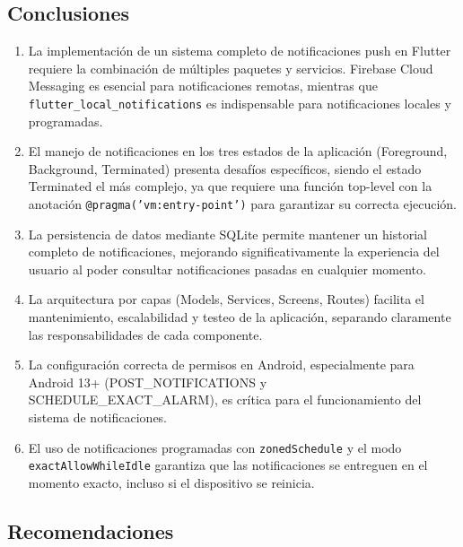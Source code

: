 \documentclass[12pt,a4paper]{article}
\begin{document}
\subsection*{Conclusiones}

\begin{enumerate}
    \item La implementación de un sistema completo de notificaciones push en Flutter requiere la combinación de múltiples paquetes y servicios. Firebase Cloud Messaging es esencial para notificaciones remotas, mientras que \texttt{flutter\_local\_notifications} es indispensable para notificaciones locales y programadas.

    \item El manejo de notificaciones en los tres estados de la aplicación (Foreground, Background, Terminated) presenta desafíos específicos, siendo el estado Terminated el más complejo, ya que requiere una función top-level con la anotación \texttt{@pragma('vm:entry-point')} para garantizar su correcta ejecución.

    \item La persistencia de datos mediante SQLite permite mantener un historial completo de notificaciones, mejorando significativamente la experiencia del usuario al poder consultar notificaciones pasadas en cualquier momento.

    \item La arquitectura por capas (Models, Services, Screens, Routes) facilita el mantenimiento, escalabilidad y testeo de la aplicación, separando claramente las responsabilidades de cada componente.

    \item La configuración correcta de permisos en Android, especialmente para Android 13+ (POST\_NOTIFICATIONS y SCHEDULE\_EXACT\_ALARM), es crítica para el funcionamiento del sistema de notificaciones.

    \item El uso de notificaciones programadas con \texttt{zonedSchedule} y el modo \texttt{exactAllowWhileIdle} garantiza que las notificaciones se entreguen en el momento exacto, incluso si el dispositivo se reinicia.
\end{enumerate}

\subsection*{Recomendaciones}
\end{document}
